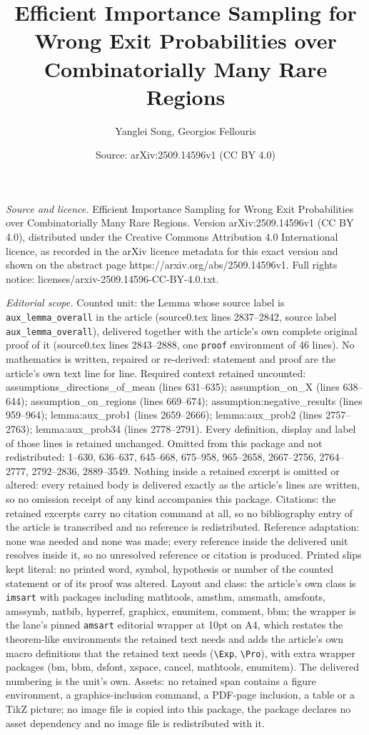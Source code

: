 \documentclass[10pt,a4paper]{amsart}
\title[Efficient Importance Sampling for Wrong Exit Probabilities o]{Efficient Importance Sampling for Wrong Exit Probabilities over Combinatorially Many Rare Regions}
\author{Yanglei Song, Georgios Fellouris}
\date{Source: arXiv:2509.14596v1 (CC BY 4.0)}
\begin{document}
\maketitle

\noindent\emph{Source and licence.} Efficient Importance Sampling for Wrong Exit Probabilities over Combinatorially Many Rare Regions. Version arXiv:2509.14596v1 (CC BY 4.0), distributed under the Creative Commons Attribution 4.0 International licence, as recorded in the arXiv licence metadata for this exact version and shown on the abstract page https://arxiv.org/abs/2509.14596v1. Full rights notice: licenses/arxiv-2509.14596-CC-BY-4.0.txt.\par\smallskip

\noindent\textit{Editorial scope.} Counted unit: the Lemma whose source label is \texttt{aux\_lemma\_overall} in the article (source0.tex lines 2837--2842, source label \texttt{aux\_lemma\_overall}), delivered together with the article's own complete original proof of it (source0.tex lines 2843--2888, one \texttt{proof} environment of 46 lines). No mathematics is written, repaired or re-derived: statement and proof are the article's own text line for line. Required context retained uncounted: assumptions\_directions\_of\_mean (lines 631--635); assumption\_on\_X (lines 638--644); assumption\_on\_regions (lines 669--674); assumption:negative\_results (lines 959--964); lemma:aux\_prob1 (lines 2659--2666); lemma:aux\_prob2 (lines 2757--2763); lemma:aux\_prob34 (lines 2778--2791). Every definition, display and label of those lines is retained unchanged. Omitted from this package and not redistributed: 1--630, 636--637, 645--668, 675--958, 965--2658, 2667--2756, 2764--2777, 2792--2836, 2889--3549. Nothing inside a retained excerpt is omitted or altered: every retained body is delivered exactly as the article's lines are written, so no omission receipt of any kind accompanies this package. Citations: the retained excerpts carry no citation command at all, so no bibliography entry of the article is transcribed and no reference is redistributed. Reference adaptation: none was needed and none was made; every reference inside the delivered unit resolves inside it, so no unresolved reference or citation is produced. Printed slips kept literal: no printed word, symbol, hypothesis or number of the counted statement or of its proof was altered. Layout and class: the article's own class is \texttt{imsart} with packages including mathtools, amsthm, amsmath, amsfonts, amssymb, natbib, hyperref, graphicx, enumitem, comment, bbm; the wrapper is the lane's pinned \texttt{amsart} editorial wrapper at 10pt on A4, which restates the theorem-like environments the retained text needs and adds the article's own macro definitions that the retained text needs (\texttt{\textbackslash Exp}, \texttt{\textbackslash Pro}), with extra wrapper packages (bm, bbm, dsfont, xspace, cancel, mathtools, enumitem). The delivered numbering is the unit's own. Assets: no retained span contains a figure environment, a graphics-inclusion command, a PDF-page inclusion, a table or a TikZ picture; no image file is copied into this package, the package declares no asset dependency and no image file is redistributed with it. 
\end{document}
